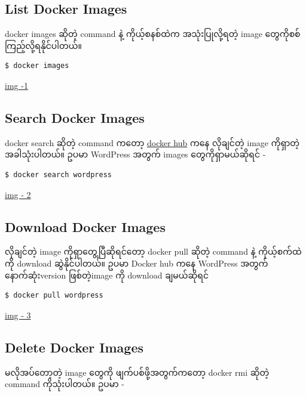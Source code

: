 \documentclass{article}
\begin{document}
\subsection{List Docker Images}\label{list-docker-images}

docker images ဆိုတဲ့ command နဲ့ ကိုယ့်စနစ်ထဲက အသုံးပြုလို့ရတဲ့ image
တွေကိုစစ်ကြည့်လို့ရနိုင်ပါတယ်။

\begin{verbatim}
$ docker images
\end{verbatim}

\href{https://drive.google.com/open?id=1_wLyiUahOQzsRfswSeS1iB8RDq4DvfbT}{img
-1}

\subsection{Search Docker Images}\label{search-docker-images}

docker search ဆိုတဲ့ command ကတော့ \href{https://hub.docker.com/}{docker
hub} ကနေ လိုချင်တဲ့ image ကိုရှာတဲ့အခါသုံးပါတယ်။ ဥပမာ WordPress အတွက်
images တွေကိုရှာမယ်ဆိုရင် -

\begin{verbatim}
$ docker search wordpress
\end{verbatim}

\href{https://drive.google.com/open?id=1gxug_Ldf9vhxAtiZK8wsFwURXyPo_YAK}{img
- 2}

\subsection{Download Docker Images}\label{download-docker-images}

လိုချင်တဲ့ image ကိုရှာတွေ့ပြီဆိုရင်တော့ docker pull ဆိုတဲ့ command နဲ့
ကိုယ့်စက်ထဲကို download ဆွဲနိုင်ပါတယ်။ ဥပမာ Docker hub ကနေ WordPress
အတွက်နောက်ဆုံးversion ဖြစ်တဲ့image ကို download ချမယ်ဆိုရင်

\begin{verbatim}
$ docker pull wordpress
\end{verbatim}

\href{https://drive.google.com/open?id=1JVqvPZtdrocB5UTqwysOcuU9hSrxfrwQ}{img
- 3}

\subsection{Delete Docker Images}\label{delete-docker-images}

မလိုအပ်တော့တဲ့ image တွေကို ဖျက်ပစ်ဖို့အတွက်ကတော့ docker rmi ဆိုတဲ့
command ကိုသုံးပါတယ်။ ဥပမာ -
\end{document}
